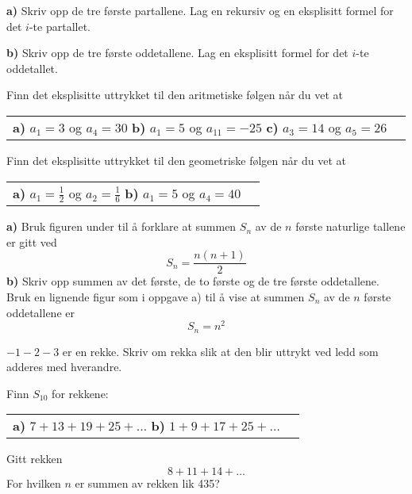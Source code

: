 




\opgt

\textbf{a)} Skriv opp de tre første partallene. Lag en rekursiv og en eksplisitt formel for det $ i $-te partallet.\os
	
\textbf{b)} Skriv opp de tre første oddetallene. Lag en eksplisitt formel for det $ i $-te oddetallet. 

Finn det eksplisitte uttrykket til  den aritmetiske følgen når du vet at\os
\begin{tabular}{@{}l l}	
	\textbf{a)} $ a_1=3 $ og $ a_4 = 30 $ \os 
	\textbf{b)} $ a_1 = 5 $ og $ a_{11} = -25 $ \os
	\textbf{c)} $ a_3 =14 $ og $ a_5=26 $ 
\end{tabular}\os

Finn det eksplisitte uttrykket til den geometriske følgen når du vet at\os
\begin{tabular}{@{}l l}	
	\textbf{a)} $ a_1=\frac{1}{2} $ og $ a_2 = \frac{1}{6} $ \os 
	\textbf{b)} $ a_1 = 5 $ og $ a_4 = 40 $
\end{tabular} \os

\begin{comment}
	\op
Bruk formelen fra oppgave \textsl{\ref{sumkvad}a} og det eksplisitte uttrykket for en aritmetisk følge til å forklare at summen av en aritmetisk rekke kan skrives som:
\[na_1 +\frac{dn(n-1)}{2} \]


\op
a) Bruk (\ref{sumg}) og vis at summen $ S_\infty $ når $ n\to\infty $ blir:
\[ S_\infty=a_1\frac{1}{1-k} \]
for $ |k|<1 $.
\end{comment}
\nes

\textbf{a)} Bruk figuren under til å forklare at summen $ S_n $ av de $ n $ første naturlige tallene er gitt ved
\[S_n=\frac{n(n+1)}{2}  \]
\textbf{b)} Skriv opp summen av det første, de to første og de tre første  oddetallene. Bruk en lignende figur som i oppgave a) til å vise at summen $ S_n $ av de $ n $ første oddetallene er
\[ S_n = n^2 \] 

$ -1-2-3 $ er en rekke. Skriv om rekka slik at den blir uttrykt ved ledd som adderes med hverandre. 

Finn $ S_{10} $ for rekkene:\os
\begin{tabular}{@{}l l}	
	\textbf{a)} $ 7+13+19+25+\ldots $\quad
	\textbf{b)} $ 1+9+17+25+\ldots $
\end{tabular} \os

Gitt rekken 
\[ 8+11+14+\ldots \]
For hvilken $ n $ er summen av rekken lik 435?

